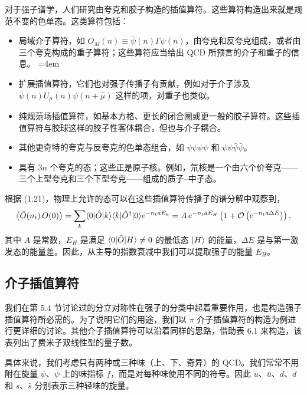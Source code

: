 对于强子谱学，人们研究由夸克和胶子构造的插值算符。这些算符构造出来就是规范不变的色单态。这类算符包括：
\begin{itemize}
  \item 局域介子算符，如 $O_M(n) \equiv \bar\psi(n)\Gamma\psi(n)$，由夸克和反夸克组成，或者由三个夸克构成的重子算符；这些算符应当给出 QCD 所预言的介子和重子的信息。
\begingroup\emergencystretch=4em   \item 扩展插值算符，它们也对强子传播子有贡献，例如对于介子涉及\linebreak[0] $\bar\psi(n)U_\mu(n)\psi(n+\hat\mu)$ 这样的项，对重子也类似。\par\endgroup
  \item 纯规范场插值算符，如基本方格、更长的闭合圈或更一般的胶子算符。这些插值算符与胶球这样的胶子性客体耦合，但也与介子耦合。
  \item 其他更奇特的夸克与反夸克的色单态组合，如 $\psi\psi\psi\psi$ 和 $\psi\psi\bar\psi\bar\psi$。
  \item 具有 $3n$ 个夸克的态；这些正是原子核。例如，氘核是一个由六个价夸克——三个上型夸克和三个下型夸克——组成的质子–中子态。
\end{itemize}

根据 (1.21)，物理上允许的态可以在这些插值算符传播子的谱分解中观察到，
\begin{equation}
  \big\langle \bar{O}(n_t)\, O(0) \big\rangle
  = \sum_k \langle0|\hat{O}|k\rangle\langle k|\hat{O}^\dagger|0\rangle e^{-n_t a E_k}
  = A\, e^{-n_t a E_H}\left( 1 + \mathcal{O}\left(e^{-n_t a \Delta E}\right) \right),
\end{equation}
其中 $A$ 是常数，$E_H$ 是满足 $\langle0|\hat{O}|H\rangle \neq 0$ 的最低态 $|H\rangle$ 的能量，$\Delta E$ 是与第一激发态的能量差。因此，从主导的指数衰减中我们可以提取强子的能量 $E_H$。

\subsection{介子插值算符}

我们在第 5.4 节讨论过的分立对称性在强子的分类中起着重要作用，也是构造强子插值算符所必需的。为了说明它们的用途，我们以 $\pi$ 介子插值算符的构造为例进行更详细的讨论。其他介子插值算符可以沿着同样的思路，借助表 6.1 来构造，该表列出了费米子双线性型的量子数。

具体来说，我们考虑只有两种或三种味（上、下、奇异）的 QCD。我们常常不用附在旋量 $\psi$、$\bar\psi$ 上的味指标 $f$，而是对每种味使用不同的符号。因此 $u$、$\bar u$、$d$、$\bar d$ 和 $s$、$\bar s$ 分别表示三种轻味的旋量。

